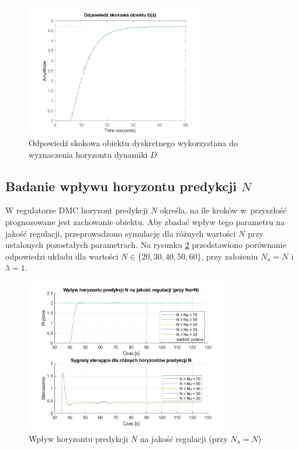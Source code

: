 \documentclass[a4paper,titlepage,11pt,floatssmall]{mwrep}
\begin{document}
\begin{figure}[H]
    \centering
    \includegraphics[width=0.7\textwidth]{kod/wykresy/step.jpg}
    \caption{Odpowiedź skokowa obiektu dyskretnego wykorzystana do wyznaczenia horyzontu dynamiki $D$}
    \label{fig:step}
\end{figure}

\subsection{Badanie wpływu horyzontu predykcji $N$}

W regulatorze DMC horyzont predykcji $N$ określa, na ile kroków w~przyszłość prognozowane jest zachowanie obiektu. Aby zbadać wpływ tego parametru na jakość regulacji, przeprowadzono symulację dla różnych wartości $N$ przy ustalonych pozostałych parametrach. Na rysunku \ref{fig:N_comparison} przedstawiono porównanie odpowiedzi układu dla wartości $N \in \{20, 30, 40, 50, 60\}$, przy założeniu $N_u = N$ i~$\lambda = 1$.

\begin{figure}[H]
    \centering
    \includegraphics[width=0.8\textwidth]{kod/wykresy/horyzont_predykcji_porownanie.jpg}
    \caption{Wpływ horyzontu predykcji $N$ na jakość regulacji (przy $N_u = N$)}
    \label{fig:N_comparison}
\end{figure}
\end{document}

